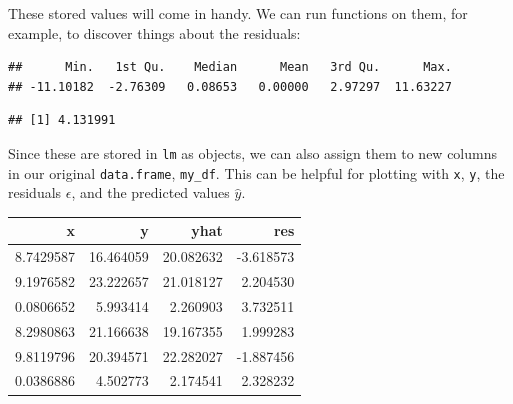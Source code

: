 \documentclass[]{book}
\newenvironment{Shaded}{\begin{snugshade}}{\end{snugshade}}
\newcommand{\KeywordTok}[1]{\textcolor[rgb]{0.13,0.29,0.53}{\textbf{#1}}}
\newcommand{\CommentTok}[1]{\textcolor[rgb]{0.56,0.35,0.01}{\textit{#1}}}
\newcommand{\OperatorTok}[1]{\textcolor[rgb]{0.81,0.36,0.00}{\textbf{#1}}}
\newcommand{\NormalTok}[1]{#1}
\theoremstyle{definition}
\theoremstyle{definition}
\theoremstyle{definition}
\theoremstyle{remark}
\begin{document}
These stored values will come in handy. We can run functions on them,
for example, to discover things about the residuals:

\begin{Shaded}
\end{Shaded}

\begin{verbatim}
##      Min.   1st Qu.    Median      Mean   3rd Qu.      Max. 
## -11.10182  -2.76309   0.08653   0.00000   2.97297  11.63227
\end{verbatim}

\begin{Shaded}
\end{Shaded}

\begin{verbatim}
## [1] 4.131991
\end{verbatim}

Since these are stored in \texttt{lm} as objects, we can also assign
them to new columns in our original \texttt{data.frame},
\texttt{my\_df}. This can be helpful for plotting with \texttt{x},
\texttt{y}, the residuals \(\epsilon\), and the predicted values
\(\hat{y}\).

\begin{Shaded}
\end{Shaded}

\begin{tabular}{r|r|r|r}
\hline
x & y & yhat & res\\
\hline
8.7429587 & 16.464059 & 20.082632 & -3.618573\\
\hline
9.1976582 & 23.222657 & 21.018127 & 2.204530\\
\hline
0.0806652 & 5.993414 & 2.260903 & 3.732511\\
\hline
8.2980863 & 21.166638 & 19.167355 & 1.999283\\
\hline
9.8119796 & 20.394571 & 22.282027 & -1.887456\\
\hline
0.0386886 & 4.502773 & 2.174541 & 2.328232\\
\hline
\end{tabular}
\end{document}
